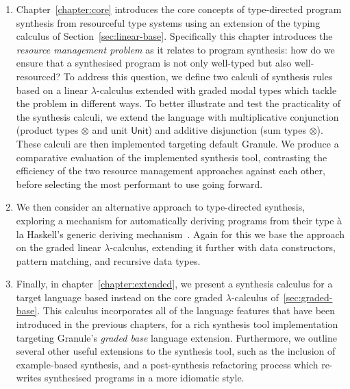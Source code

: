 \begin{enumerate}
        \item Chapter~\ref{chapter:core} introduces the core concepts of
        type-directed program synthesis from resourceful type systems using an
        extension of the typing calculus of Section~\ref{sec:linear-base}.
        Specifically this chapter introduces the \textit{resource management
        problem} as it relates to program synthesis: how do we ensure that a
        synthesised program is not only well-typed but also well-resourced? To
        address this question, we define two calculi of synthesis rules based on
        a linear $\lambda$-calculus extended with graded modal types which
        tackle the problem in different ways. To better illustrate and test the
        practicality of the synthesis calculi, we extend the language with
        multiplicative conjunction (product types $\otimes$ and unit $\mathsf{Unit}$) and
        additive disjunction (sum types $\otimes$). These calculi are then
        implemented targeting default Granule. We produce a comparative
        evaluation of the implemented synthesis tool, contrasting the efficiency
        of the two resource management approaches against each other, before
        selecting the most performant to use going forward.  

        \item We then consider an alternative approach to type-directed synthesis,
        exploring a mechanism for automatically deriving programs from their
        type à la Haskell's generic deriving mechanism~\citep{generic-deriving}.
        Again for this we base the approach on the graded linear
        $\lambda$-calculus, extending it further with data constructors, pattern
        matching, and recursive data types.
        \item Finally, in chapter~\ref{chapter:extended}, we present a synthesis
        calculus for a target language based instead on the core graded
        $\lambda$-calculus of~\ref{sec:graded-base}. This calculus incorporates
        all of the language features that have been introduced in the previous chapters,
        for a rich synthesis tool implementation targeting Granule's
        \emph{graded base} language extension. Furthermore, we outline several other useful 
        extensions to the synthesis tool, such as the inclusion of example-based synthesis,
        and a post-synthesis refactoring process which re-writes synthesised programs in 
        a more idiomatic style.


\end{enumerate}
